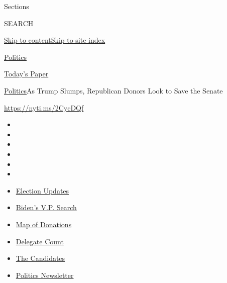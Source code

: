Sections

SEARCH

\protect\hyperlink{site-content}{Skip to
content}\protect\hyperlink{site-index}{Skip to site index}

\href{https://www.nytimes3xbfgragh.onion/section/politics}{Politics}

\href{https://myaccount.nytimes3xbfgragh.onion/auth/login?response_type=cookie\&client_id=vi}{}

\href{https://www.nytimes3xbfgragh.onion/section/todayspaper}{Today's
Paper}

\href{/section/politics}{Politics}\textbar{}As Trump Slumps, Republican
Donors Look to Save the Senate

\url{https://nyti.ms/2CycDQf}

\begin{itemize}
\item
\item
\item
\item
\item
\item
\end{itemize}

\begin{itemize}
\item
  \href{https://www.nytimes3xbfgragh.onion/2020/08/03/us/elections/biden-vs-trump.html?action=click\&pgtype=Article\&state=default\&region=TOP_BANNER\&context=storylines_menu}{Election
  Updates}
\item
  \href{https://www.nytimes3xbfgragh.onion/article/biden-vice-president-2020.html?action=click\&pgtype=Article\&state=default\&region=TOP_BANNER\&context=storylines_menu}{Biden's
  V.P. Search}
\item
  \href{https://www.nytimes3xbfgragh.onion/interactive/2020/07/24/us/politics/trump-biden-campaign-donors.html?action=click\&pgtype=Article\&state=default\&region=TOP_BANNER\&context=storylines_menu}{Map
  of Donations}
\item
  \href{https://www.nytimes3xbfgragh.onion/interactive/2020/us/elections/delegate-count-primary-results.html?action=click\&pgtype=Article\&state=default\&region=TOP_BANNER\&context=storylines_menu}{Delegate
  Count}
\item
  \href{https://www.nytimes3xbfgragh.onion/interactive/2019/us/politics/2020-presidential-candidates.html?action=click\&pgtype=Article\&state=default\&region=TOP_BANNER\&context=storylines_menu}{The
  Candidates}
\item
  \href{https://www.nytimes3xbfgragh.onion/newsletters/politics?action=click\&pgtype=Article\&state=default\&region=TOP_BANNER\&context=storylines_menu}{Politics
  Newsletter}
\end{itemize}

